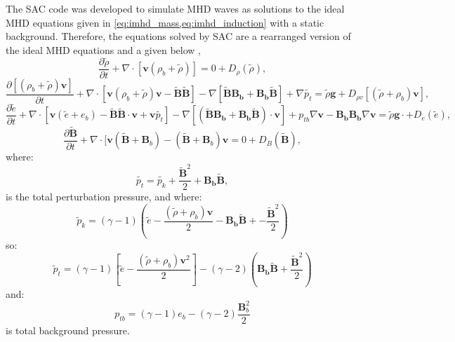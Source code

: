 The SAC code was developed to simulate MHD waves as solutions to the ideal MHD equations given in \cref{eq:imhd_mass,eq:imhd_induction} with a static background.
Therefore, the equations solved by SAC are a rearranged version of the ideal MHD equations and a given below \citep[taken from][]{shelyag2008},
\begin{equation}
\frac{\partial\tilde{\rho}}{\partial t}+\nabla\cdot[\mathbf{v}(\rho_{b}+\tilde{\rho})]=0+D_{\rho}(\tilde{\rho}),
\end{equation}
\begin{equation}
\frac{\partial[(\rho_{b}+\tilde{\rho})\mathbf{v}]}{\partial t}+\nabla\cdot[\mathbf{v}(\rho_{b}+\tilde{\rho})\mathbf{v}-\mathbf{\tilde{B}\tilde{B}}]-\nabla[\mathbf{\tilde{B}}\mathbf{B_{b}}+\mathbf{B_{b}}\mathbf{\tilde{B}}]+\nabla\tilde{p_{t}}=\tilde{\rho}\mathbf{g}+D_{\rho v}[(\tilde{\rho}+\rho_{b})\mathbf{v}],
\end{equation}
\begin{equation}
\frac{\partial\tilde{e}}{\partial t}+\nabla\cdot[\mathbf{v}(\tilde{e}+e_{b})-\mathbf{\tilde{B}\tilde{B}}\cdot\mathbf{v}+\mathbf{v}\tilde{p_{t}}]-\nabla[(\mathbf{\tilde{B}B_{b}}+\mathbf{B_{b}\tilde{B}})\cdot\mathbf{v}]+p_{tb}\nabla\mathbf{v}-\mathbf{B_{b}}\mathbf{B_{b}}\nabla\mathbf{v}=\tilde{\rho}\mathbf{g}\cdot+D_{e}(\tilde{e}),
\end{equation}
\begin{equation}
\frac{\partial\mathbf{\tilde{B}}}{\partial t}+\nabla\cdot[\mathbf{v}(\mathbf{\tilde{B}}+\mathbf{B}_{b})-(\mathbf{\tilde{B}}+\mathbf{B}_{b})\mathbf{v}=0+D_{B}(\mathbf{\tilde{B}}),
\end{equation}
where:
\begin{equation}
\tilde{p_{t}}=\tilde{p_{k}}+\frac{\tilde{\mathbf{B}}^{2}}{2}+\mathbf{B_{b}\tilde{B}},
\end{equation}
is the total perturbation pressure, and where: 
\begin{equation}
\tilde{p}_{k}=(\gamma-1)\left(\tilde{e}-\frac{(\tilde{\rho}+\rho_{b})\mathbf{v}}{2}-\mathbf{B_{b}\tilde{B}}+-\frac{\tilde{\mathbf{B}}^{2}}{2}\right)
\end{equation}
so:
\begin{equation}
\tilde{p}_{t}=(\gamma-1)\left[\tilde{e}-\frac{(\tilde{\rho}+\rho_{b})\mathbf{v}^{2}}{2}\right]-(\gamma-2)\left(\mathbf{B_{b}\tilde{B}}+\frac{\tilde{\mathbf{B}}^{2}}{2}\right)
\end{equation}
and:
\begin{equation}
p_{tb}=(\gamma-1)e_{b}-(\gamma-2)\frac{\mathbf{B}_{b}^{2}}{2}
\end{equation}
is total background pressure.

